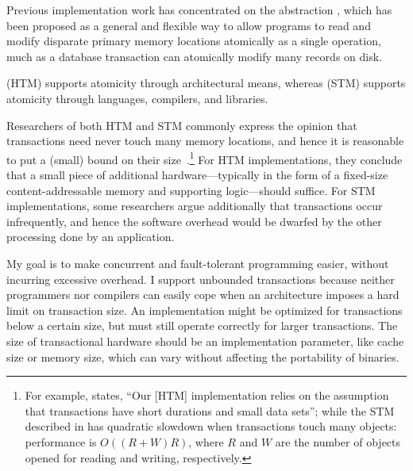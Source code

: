 Previous implementation work has concentrated on the
 abstraction
\cite{Knight86,HerlihyMo93,StoneStHe93,RajwarGo02,ShavitTo95,HerlihyLuMoSc03},
which has
been proposed as a general and flexible way to allow programs to read
and modify disparate primary memory locations atomically as a single
operation, much as a database transaction can atomically modify many
records on disk.

 (HTM) supports atomicity through
architectural means, whereas 
(STM) supports atomicity through languages, compilers, and libraries.


Researchers of both HTM and STM commonly express the opinion that
transactions need never touch many memory locations, and hence it is
reasonable to put a (small) bound on their
size~\cite{HerlihyMo93,HerlihyLuMoSc03}.\footnote{%
For example, \cite[section 5.2]{HerlihyMo93} states,
``Our [HTM] implementation relies on the assumption that transactions have
short durations and small data sets''; while 
the STM described in \cite{HerlihyLuMoSc03} has quadratic slowdown when
transactions touch many objects: performance is $O((R+W)R)$, where $R$
and $W$ are the number of objects opened for reading and writing,
respectively.}
For HTM implementations,
they conclude that a small piece of additional hardware---typically in
the form of a fixed-size content-addressable memory and supporting
logic---should suffice.  For STM implementations, some researchers
argue additionally that transactions occur infrequently, and hence the
software overhead would be dwarfed by the other processing done by an
application.


My goal is to
make concurrent and fault-tolerant programming easier,
without incurring excessive overhead.  I support
unbounded transactions because neither programmers nor compilers can
easily cope when an architecture imposes a hard limit on transaction
size.  An implementation might be optimized for transactions below a
certain size, but must still operate correctly for larger
transactions.  The size of transactional hardware should be an
implementation parameter, like cache size or memory size, which can
vary without affecting the portability of binaries.

